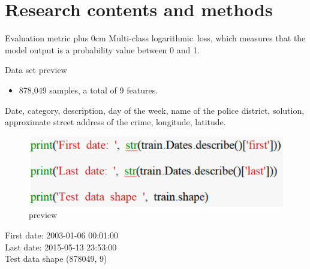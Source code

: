 \documentclass[
 size=14pt,
 paper=smartboard,  %
 mode=present, 		%
 display=slides, 	%
 style=tuliplab,  	%
 pauseslide,
 fleqn,leqno]{powerdot}
\renewcommand{\raggedright}{\leftskip=0pt \rightskip=0pt plus 0cm}
\begin{document}
\section{Research contents and methods}

\begin{slide}{Evaluation metric}
	\raggedright
	Multi-class logarithmic loss, which measures that the model output is a probability value between 0 and 1.


\end{slide}

\begin{slide}{Data set preview}
	\begin{itemize}
	\item 878,049 samples, a total of 9 features.
	\end{itemize}
	Date, category, description, day of the week, name of the police district, solution, approximate street address of the crime, longitude, latitude.\\
	\begin{center}
		\begin{figure}[htbp]
			\includegraphics[scale=0.6]{./pic/qmcode1.eps}
			\caption{preview}
		\end{figure}
	\end{center}
	First date:  2003-01-06 00:01:00\\
	Last date:  2015-05-13 23:53:00\\
	Test data shape  (878049, 9)\\
	
	
\end{slide}
\end{document}
